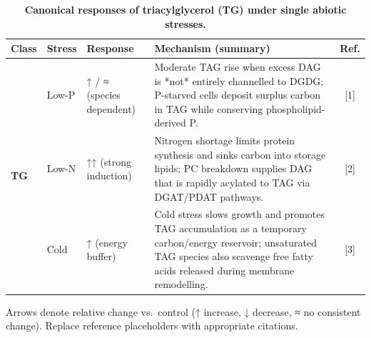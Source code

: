 \documentclass[10pt,letterpaper]{article}
\begin{document}
\begin{table}[!ht]
  \begin{adjustwidth}{-2.25in}{0in}  %
    \centering
    \caption{\bf Canonical responses of triacylglycerol (TG) under single abiotic stresses.}
    \label{table:TG_responses}
    \begin{tabularx}{\textwidth}{@{} l l l X c @{}}
      \toprule
      \textbf{Class} & \textbf{Stress} & \textbf{Response} & \textbf{Mechanism (summary)} & \textbf{Ref.} \\
      \midrule
      \multirow{3}{*}{\textbf{TG}}
        & Low-P & ↑ / ≈ (species dependent) &
          Moderate TAG rise when excess DAG is *not* entirely channelled to DGDG;  
          P-starved cells deposit surplus carbon in TAG while conserving phospholipid-derived P. & [1] \\[0.4em]
        & Low-N & ↑↑ (strong induction) &
          Nitrogen shortage limits protein synthesis and sinks carbon into storage lipids;  
          PC breakdown supplies DAG that is rapidly acylated to TAG via DGAT/PDAT pathways. & [2] \\[0.4em]
        & Cold  & ↑ (energy buffer) &
          Cold stress slows growth and promotes TAG accumulation as a temporary carbon/energy reservoir;  
          unsaturated TAG species also scavenge free fatty acids released during membrane remodelling. & [3] \\
      \bottomrule
    \end{tabularx}
    \begin{flushleft}
      {\footnotesize Arrows denote relative change vs.\ control (↑ increase, ↓ decrease, ≈ no consistent change).  
      Replace reference placeholders with appropriate citations.}
    \end{flushleft}
  \end{adjustwidth}
\end{table}
\end{document}

